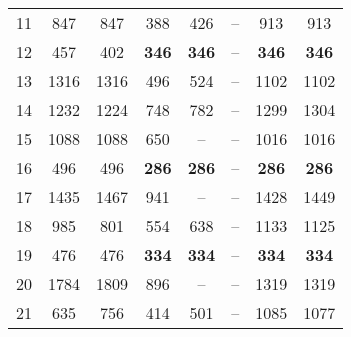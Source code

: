 \begin{table}[ht]
{\begin{tabular}{c|ccccccc}
            11 & 847               & 847               & 388               & 426               & --                & 913               & 913               \\ 
            12 & 457               & 402               & \textbf{346}      & \textbf{346}      & --                & \textbf{346}      & \textbf{346}      \\ 
            13 & 1316              & 1316              & 496               & 524               & --                & 1102              & 1102              \\ 
            14 & 1232              & 1224              & 748               & 782               & --                & 1299              & 1304              \\ 
            15 & 1088              & 1088              & 650               & --                & --                & 1016              & 1016              \\ 
            16 & 496               & 496               & \textbf{286}      & \textbf{286}      & --                & \textbf{286}      & \textbf{286}      \\ 
            17 & 1435              & 1467              & 941               & --                & --                & 1428              & 1449              \\ 
            18 & 985               & 801               & 554               & 638               & --                & 1133              & 1125              \\ 
            19 & 476               & 476               & \textbf{334}      & \textbf{334}      & --                & \textbf{334}      & \textbf{334}      \\ 
            20 & 1784              & 1809              & 896               & --                & --                & 1319              & 1319              \\ 
            21 & 635               & 756               & 414               & 501               & --                & 1085              & 1077              \\ 
            \bottomrule
        \end{tabular}
    }
\end{table}


